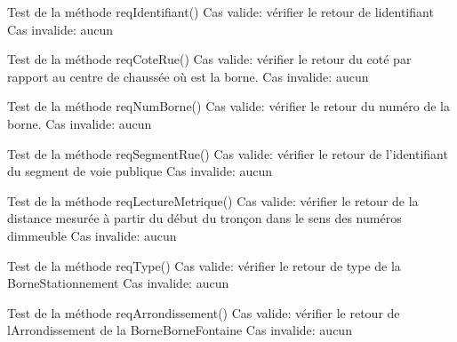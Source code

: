 \begin{DoxyRefList}
%
Test de la méthode req\+Identifiant() Cas valide\+: vérifier le retour de l\textquotesingle{}identifiant Cas invalide\+: aucun  
\item[Member \mbox{\hyperlink{_borne_stationnement_testeur_8cpp_a00c69efc4c25bd2502b9d395a1908924}{T\+E\+S\+T\+\_\+F}} (\mbox{\hyperlink{class_un_borne_stationnement}{Un\+Borne\+Stationnement}}, req\+Cote\+Rue)]\label{test__test000007}%
%
Test de la méthode req\+Cote\+Rue() Cas valide\+: vérifier le retour du coté par rapport au centre de chaussée où est la borne. Cas invalide\+: aucun  
\item[Member \mbox{\hyperlink{_borne_stationnement_testeur_8cpp_aa9eac715dfeb7fa72c7edab55d321723}{T\+E\+S\+T\+\_\+F}} (\mbox{\hyperlink{class_un_borne_stationnement}{Un\+Borne\+Stationnement}}, req\+Num\+Borne)]\label{test__test000006}%
%
Test de la méthode req\+Num\+Borne() Cas valide\+: vérifier le retour du numéro de la borne. Cas invalide\+: aucun  
\item[Member \mbox{\hyperlink{_borne_stationnement_testeur_8cpp_a99f7134f7c7bf933e996eca3594f4067}{T\+E\+S\+T\+\_\+F}} (\mbox{\hyperlink{class_un_borne_stationnement}{Un\+Borne\+Stationnement}}, req\+Segment\+Rue)]\label{test__test000005}%
%
Test de la méthode req\+Segment\+Rue() Cas valide\+: vérifier le retour de l’identifiant du segment de voie publique Cas invalide\+: aucun  
\item[Member \mbox{\hyperlink{_borne_stationnement_testeur_8cpp_a6d45e4e841447398c83242de961d1460}{T\+E\+S\+T\+\_\+F}} (\mbox{\hyperlink{class_un_borne_stationnement}{Un\+Borne\+Stationnement}}, req\+Lecture\+Metrique)]\label{test__test000004}%
%
Test de la méthode req\+Lecture\+Metrique() Cas valide\+: vérifier le retour de la distance mesurée à partir du début du tronçon dans le sens des numéros d\textquotesingle{}immeuble Cas invalide\+: aucun  
\item[Member \mbox{\hyperlink{_borne_stationnement_testeur_8cpp_a89728395f9f17f66a3800ed9825ab21d}{T\+E\+S\+T\+\_\+F}} (\mbox{\hyperlink{class_un_borne_stationnement}{Un\+Borne\+Stationnement}}, req\+Type)]\label{test__test000003}%
%
Test de la méthode req\+Type() Cas valide\+: vérifier le retour de type de la Borne\+Stationnement Cas invalide\+: aucun  
\item[Member \mbox{\hyperlink{_borne_fontaine_taisteur_8cpp_a4cfa188bd5646c2b4e8a757084b9f2ba}{T\+E\+S\+T\+\_\+F}} (\mbox{\hyperlink{class_un_borne_borne_fontaine}{Un\+Borne\+Borne\+Fontaine}}, req\+Arrondissement)]\label{test__test000002}%
%
Test de la méthode req\+Arrondissement() Cas valide\+: vérifier le retour de l\textquotesingle{}Arrondissement de la Borne\+Borne\+Fontaine Cas invalide\+: aucun 
\end{DoxyRefList}